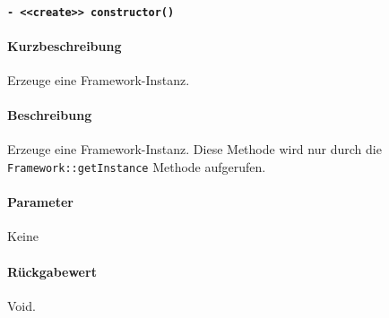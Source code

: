 \paragraph{\texttt{- <<create>> constructor()}}\label{AP_Framework_constructor}%
\paragraph*{Kurzbeschreibung}
Erzeuge eine Framework-Instanz.
\paragraph*{Beschreibung}
Erzeuge eine Framework-Instanz.
Diese Methode wird nur durch die \verb#Framework::getInstance# Methode aufgerufen.
\paragraph*{Parameter}
Keine
\paragraph*{Rückgabewert}
Void.